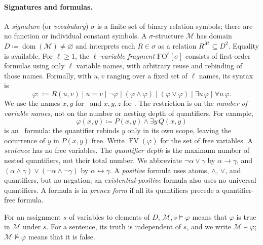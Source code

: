 \paragraph{Signatures and formulas.}
A \emph{signature} (or \emph{vocabulary}) $\sigma$ is a finite set of binary relation symbols;
there are no function or individual constant symbols. A $\sigma$-structure
$\mathcal M$ has domain $D\coloneqq\operatorname{dom}(\mathcal M)\ne\varnothing$
and interprets each $R\in\sigma$ as a relation $R^{\mathcal M}\subseteq D^2$.
Equality is available. For $\ell\ge1$, the \emph{$\ell$-variable fragment}
$\mathrm{FO}^{\ell}[\sigma]$ consists of first-order formulas using only
$\ell$ variable names, with arbitrary reuse and rebinding of those names.
Formally, with $u,v$ ranging over a fixed set of $\ell$ names, its syntax is
\[
 \varphi::=R(u,v)\mid u=v\mid\neg\varphi
 \mid(\varphi\land\varphi)\mid(\varphi\lor\varphi)
 \mid\exists u\,\varphi\mid\forall u\,\varphi.
\]
We use the names $x,y$ for \FOtwo\ and $x,y,z$ for \FOthree.
The restriction is on the \emph{number of variable names}, not on the
number or nesting depth of quantifiers. For example,
\[
 \varphi(x,y)\coloneqq P(x,y)\land\exists y\,Q(x,y)
\]
is an \FOtwo\ formula: the quantifier rebinds $y$ only in its own scope,
leaving the occurrence of $y$ in $P(x,y)$ free. Write
$\operatorname{FV}(\varphi)$ for the set of free variables.
A \emph{sentence} has no free variables. The \emph{quantifier depth}
is the maximum number of nested quantifiers, not their total number.
We abbreviate $\neg\alpha\lor\gamma$ by $\alpha\to\gamma$, and
$(\alpha\land\gamma)\lor(\neg\alpha\land\neg\gamma)$ by
$\alpha\leftrightarrow\gamma$.
A \emph{positive} formula uses atoms, $\land$, $\lor$, and quantifiers,
but no negation; an \emph{existential-positive} formula also uses no
universal quantifiers. A formula is in \emph{prenex form} if all its
quantifiers precede a quantifier-free formula.

For an assignment $s$ of variables to elements of $D$,
$\mathcal M,s\models\varphi$ means that $\varphi$ is true in
$\mathcal M$ under $s$. For a sentence, its truth is independent of
$s$, and we write $\mathcal M\models\varphi$;
$\mathcal M\not\models\varphi$ means that it is false.

